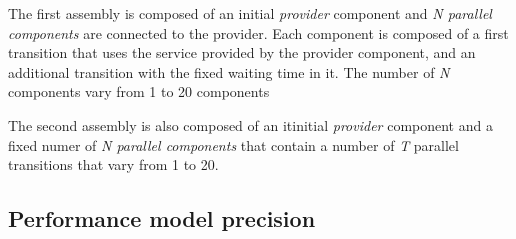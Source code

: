 The first assembly is composed of an initial \emph{provider} component and \emph{N parallel components} are connected to the provider. Each component is composed of a first transition that uses the service provided by the provider component, and an additional transition with the fixed waiting time in it. The number of \emph{N} components vary from 1 to 20 components %

The second assembly is also composed of an itinitial \emph{provider} component and a fixed numer of \emph{N parallel components} that contain a number of \emph{T} parallel transitions that vary from 1 to 20.%









\subsection{Performance model precision}


